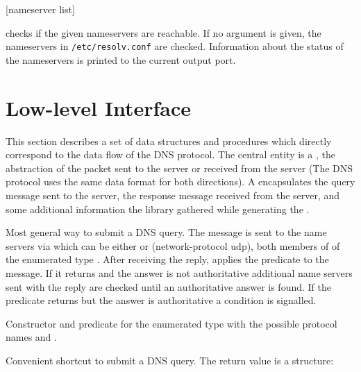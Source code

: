  {[nameserver list]} {\undefined}
\begin{desc}
   checks if the given nameservers are reachable.
  If no argument is given, the nameservers in \texttt{/etc/resolv.conf}
  are checked. Information about the status of the nameservers is printed
  to the current output port.
\end{desc}

\section{Low-level Interface}

This section describes a set of data structures and procedures which
directly correspond to the data flow of the DNS protocol. The central
entity is a , the abstraction of the packet sent to the
server or received from the server (The DNS protocol uses the same
data format for both directions). A  encapsulates the
query message sent to the server, the response message received from
the server, and some additional information the library gathered while
generating the .

\begin{desc}
  Most general way to submit a DNS query. The message is sent to the
  name servers via  which can be either
   or {(network-protocol udp)}, both
  members of of the enumerated type . After
  receiving the reply,  applies the predicate
   to the message. If it returns \sharpf{} and the
  answer is not authoritative additional name servers sent with the
  reply are checked until an authoritative answer is found. If the
  predicate returns \sharpf{} but the answer is authoritative a
   condition is signalled.
\end{desc}

\begin{desc}
  Constructor and predicate for the enumerated type
   with the possible protocol names  and
  .
\end{desc}
\begin{desc}
  Convenient shortcut to submit a DNS query. The return value
  is a  structure:
\end{desc}

